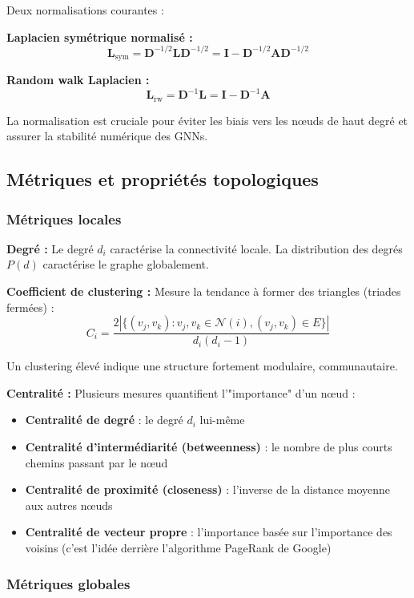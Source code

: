 Deux normalisations courantes :

\textbf{Laplacien symétrique normalisé :}
\[
\mathbf{L}_{\text{sym}} = \mathbf{D}^{-1/2}\mathbf{L}\mathbf{D}^{-1/2} = \mathbf{I} - \mathbf{D}^{-1/2}\mathbf{A}\mathbf{D}^{-1/2}
\]

\textbf{Random walk Laplacien :}
\[
\mathbf{L}_{\text{rw}} = \mathbf{D}^{-1}\mathbf{L} = \mathbf{I} - \mathbf{D}^{-1}\mathbf{A}
\]

La normalisation est cruciale pour éviter les biais vers les nœuds de haut degré et assurer la stabilité numérique des GNNs.

\subsection{Métriques et propriétés topologiques}

\subsubsection{Métriques locales}

\textbf{Degré :}
Le degré $d_i$ caractérise la connectivité locale. La distribution des degrés $P(d)$ caractérise le graphe globalement.

\textbf{Coefficient de clustering :}
Mesure la tendance à former des triangles (triades fermées) :
\[
C_i = \frac{2|\{(v_j, v_k) : v_j, v_k \in \mathcal{N}(i), (v_j, v_k) \in E\}|}{d_i(d_i-1)}
\]

Un clustering élevé indique une structure fortement modulaire, communautaire.

\textbf{Centralité :}
Plusieurs mesures quantifient l'"importance" d'un nœud :
\begin{itemize}
    \item \textbf{Centralité de degré} : le degré $d_i$ lui-même
    \item \textbf{Centralité d'intermédiarité (betweenness)} : le nombre de plus courts chemins passant par le nœud
    \item \textbf{Centralité de proximité (closeness)} : l'inverse de la distance moyenne aux autres nœuds
    \item \textbf{Centralité de vecteur propre} : l'importance basée sur l'importance des voisins (c'est l'idée derrière l'algorithme PageRank de Google)
\end{itemize}

\subsubsection{Métriques globales}

